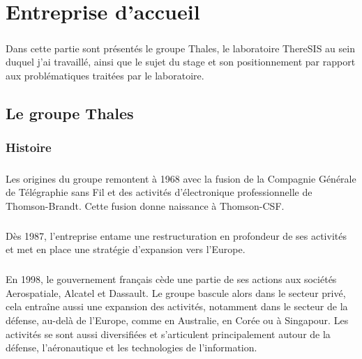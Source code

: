 \chapter{Entreprise d'accueil}
\thispagestyle{fancy} %

\paragraph{} Dans cette partie sont pr\'esent\'es le groupe Thales, le laboratoire ThereSIS au sein duquel j'ai travaill\'e, ainsi que le sujet du stage et son positionnement par rapport aux probl\'ematiques trait\'ees par le laboratoire.


\section{Le groupe Thales}

\subsection{Histoire}

\paragraph{} Les origines du groupe remontent à 1968 avec la fusion de la Compagnie G\'en\'erale de T\'el\'egraphie sans Fil et des activit\'es d’\'electronique professionnelle de Thomson-Brandt. Cette fusion donne naissance à Thomson-CSF.

\paragraph{} Dès 1987, l’entreprise entame une restructuration en profondeur de ses activit\'es et met en place une strat\'egie d’expansion vers l’Europe.

\paragraph{} En 1998, le gouvernement français cède une partie de ses actions aux soci\'et\'es Aerospatiale, Alcatel et Dassault. Le groupe bascule alors dans le secteur priv\'e, cela entraîne aussi une expansion des activit\'es, notamment dans le secteur de la d\'efense, au-delà de l’Europe, comme en Australie, en Cor\'ee ou à Singapour. Les activit\'es se sont aussi diversifi\'ees et s’articulent principalement autour de la d\'efense, l’a\'eronautique et les technologies de l’information.

